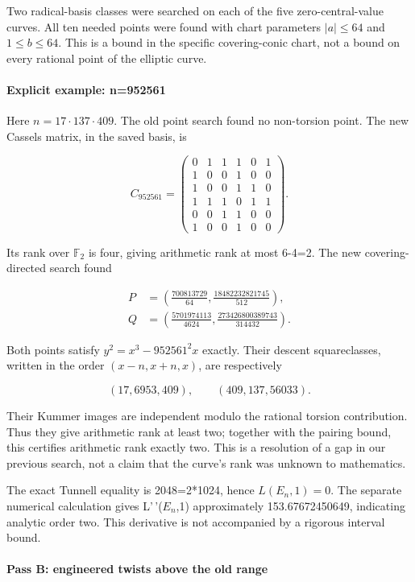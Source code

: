 \documentclass[11pt]{article}
\begin{document}
Two radical-basis classes were searched on each of the five zero-central-value curves. All ten needed points were found with chart parameters \(|a|\le64\) and \(1\le b\le64\). This is a bound in the specific covering-conic chart, not a bound on every rational point of the elliptic curve.

\paragraph{Explicit example: n=952561}

Here \(n=17\cdot137\cdot409\). The old point search found no non-torsion point. The new Cassels matrix, in the saved basis, is

\[
C_{952561}=\begin{pmatrix}
0&1&1&1&0&1\\1&0&0&1&0&0\\1&0&0&1&1&0\\
1&1&1&0&1&1\\0&0&1&1&0&0\\1&0&0&1&0&0
\end{pmatrix}.
\]

Its rank over \(\mathbb F_2\) is four, giving arithmetic rank at most 6-4=2. The new covering-directed search found

\begin{align*}
P&=\left(\frac{700813729}{64},\frac{18482232821745}{512}\right),\\
Q&=\left(\frac{5701974113}{4624},\frac{273426800389743}{314432}\right).
\end{align*}

Both points satisfy \(y^2=x^3-952561^2x\) exactly. Their descent squareclasses, written in the order \((x-n,x+n,x)\), are respectively

\[(17,6953,409),\qquad(409,137,56033).\]

Their Kummer images are independent modulo the rational torsion contribution. Thus they give arithmetic rank at least two; together with the pairing bound, this certifies arithmetic rank exactly two. This is a resolution of a gap in our previous search, not a claim that the curve's rank was unknown to mathematics.

The exact Tunnell equality is 2048=2*1024, hence \(L(E_n,1)=0\). The separate numerical calculation gives L'\,'(\(E_n\),1) approximately 153.67672450649, indicating analytic order two. This derivative is not accompanied by a rigorous interval bound.

\paragraph{Pass B: engineered twists above the old range}
\end{document}
